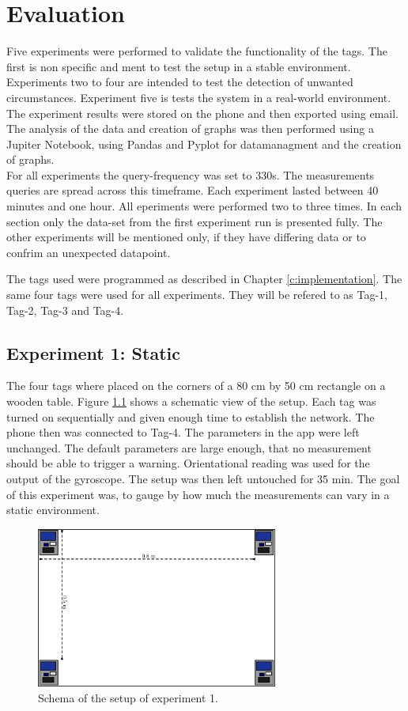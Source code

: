 \chapter{Evaluation}
\label{chap:evaluation}

Five experiments were performed to validate the functionality of the tags.
The first is non specific and ment to test the setup in a stable environment.
Experiments two to four are intended to test the detection of unwanted circumstances.
Experiment five is tests the system in a real-world environment.
The experiment results were stored on the phone and then exported using email.
The analysis of the data and creation of graphs was then performed using a Jupiter Notebook, using Pandas and Pyplot for datamanagment and the creation of graphs.\\
For all experiments the query-frequency was set to 330s.
The measurements queries are spread across this timeframe.
Each experiment lasted between 40 minutes and one hour.
All eperiments were performed two to three times.
In each section only the data-set from the first experiment run is presented fully.
The other experiments will be mentioned only, if they have differing data or to confrim an unexpected datapoint.

The tags used were programmed as described in Chapter \ref{c:implementation}.
The same four tags were used for all experiments.
They will be refered to as Tag-1, Tag-2, Tag-3 and Tag-4.


\section{Experiment 1: Static}
\label{ss:exp_1}
The four tags where placed on the corners of a 80 cm by 50 cm rectangle on a wooden table.
Figure \ref{f:exp1_schematic} shows a schematic view of the setup.
Each tag was turned on sequentially and given enough time to establish the network.
The phone then was connected to Tag-4.
The parameters in the app were left unchanged.
The default parameters are large enough, that no measurement should be able to trigger a warning.
Orientational reading was used for the output of the gyroscope.
The setup was then left untouched for 35 min.
The goal of this experiment was, to gauge by how much the measurements can vary in a static environment.

\begin{figure}[ht!]
	\centering
	\includegraphics[width=300px]{graphics/schematics/experiment_1.png}
	\caption{Schema of the setup of experiment 1.}
	\label{f:exp1_schematic}
\end{figure}



